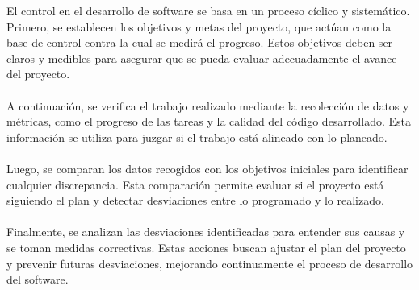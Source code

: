 \documentclass{templateNote}
\begin{document}
\noindent El control en el desarrollo de software se basa en un proceso cíclico y sistemático. Primero, se establecen los objetivos y metas del proyecto, que actúan como la base de control contra la cual se medirá el progreso. Estos objetivos deben ser claros y medibles para asegurar que se pueda evaluar adecuadamente el avance del proyecto.\\\\
A continuación, se verifica el trabajo realizado mediante la recolección de datos y métricas, como el progreso de las tareas y la calidad del código desarrollado. Esta información se utiliza para juzgar si el trabajo está alineado con lo planeado.\\\\
Luego, se comparan los datos recogidos con los objetivos iniciales para identificar cualquier discrepancia. Esta comparación permite evaluar si el proyecto está siguiendo el plan y detectar desviaciones entre lo programado y lo realizado.\\\\
Finalmente, se analizan las desviaciones identificadas para entender sus causas y se toman medidas correctivas. Estas acciones buscan ajustar el plan del proyecto y prevenir futuras desviaciones, mejorando continuamente el proceso de desarrollo del software.
\end{document}
